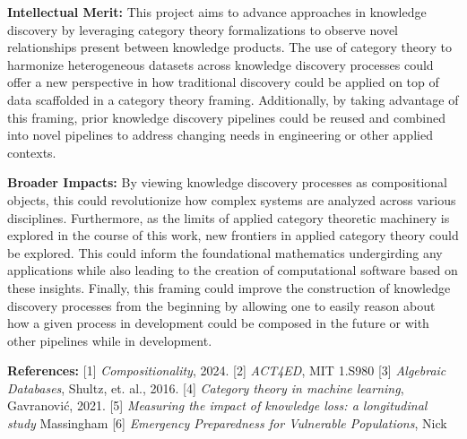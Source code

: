 \documentclass[11pt]{extarticle}
\begin{document}
\textbf{Intellectual Merit:} This project aims to advance approaches in knowledge discovery by leveraging category theory formalizations to observe novel relationships present between knowledge products. 
The use of category theory to harmonize heterogeneous datasets across knowledge discovery processes could offer a new perspective in how traditional discovery could be applied on top of data scaffolded in a category theory framing.
Additionally, by taking advantage of this framing, prior knowledge discovery pipelines could be reused and combined into novel pipelines to address changing needs in engineering or other applied contexts. 

\textbf{Broader Impacts:} By viewing knowledge discovery processes as compositional objects, this could revolutionize how complex systems are analyzed across various disciplines.
Furthermore, as the limits of applied category theoretic machinery is explored in the course of this work, new frontiers in applied category theory could be explored.
This could inform the foundational mathematics undergirding any applications while also leading to the creation of computational software based on these insights.
Finally, this framing could improve the construction of knowledge discovery processes from the beginning by allowing one to easily reason about how a given process in development could be composed in the future or with other pipelines while in development.

\textbf{References:} [1] \textit{Compositionality}, 2024. [2] \textit{ACT4ED}, MIT 1.S980 [3] \textit{Algebraic Databases}, Shultz, et. al., 2016. [4] \textit{Category theory in machine learning}, Gavranović, 2021. [5] \textit{Measuring the impact of knowledge loss: a longitudinal study} Massingham [6] \textit{Emergency Preparedness for Vulnerable Populations}, Nick
\end{document}
